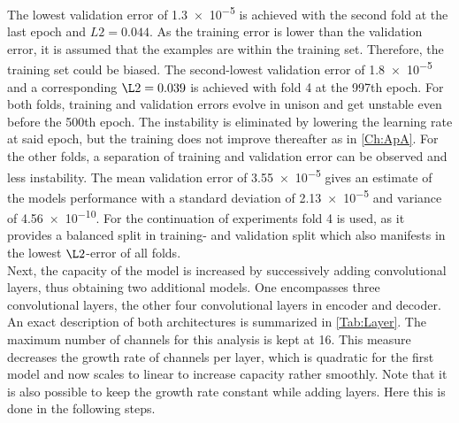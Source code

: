 The lowest validation error of \num{1.3e-5} is achieved with the second fold at the last epoch and \(L2 = 0.044\). As the training error is lower than the validation error, it is assumed that the  examples are within the training set. Therefore, the training set could be biased. The second-lowest validation error of \num{1.8e-5} and a corresponding \(\L2=0.039\) is achieved with fold 4 at the 997th epoch. For both folds, training and validation errors evolve in unison and get unstable even before the 500th epoch. The instability is eliminated by lowering the learning rate at said epoch, but the training does not improve thereafter as in \cref{Ch:ApA}. For the other folds, a separation of training and validation error can be observed and less instability. The mean validation error of \num{3.55e-5} gives an estimate of the models performance with a standard deviation of \num{2.13e-5} and variance of \num{4.56e-10}. For the continuation of experiments fold 4 is used, as it provides a balanced split in training- and validation split which also manifests in the lowest \(\L2\)-error of all folds.\\
Next, the capacity of the model is increased by successively adding convolutional layers, thus obtaining two additional models. One encompasses three convolutional layers, the other four convolutional layers in encoder and decoder. An exact description of both architectures is summarized in \cref{Tab:Layer}. The maximum number of channels for this analysis is kept at 16. This measure decreases the growth rate of channels per layer, which is quadratic for the first model and now scales to linear to increase capacity rather smoothly. Note that it is also possible to keep the growth rate constant while adding layers. Here this is done in the following steps.\\
